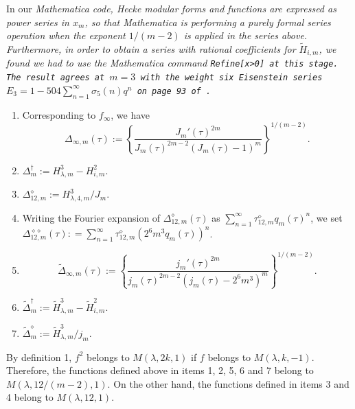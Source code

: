 \documentclass{article}
\begin{document}
In our 
\it Mathematica \rm code, 
Hecke modular forms and functions 
are expressed as 
power series in $x_m$,
so that \it Mathematica \rm is
performing a purely formal 
series operation
when the exponent $1/(m-2)$
is applied in the series above.
Furthermore, in order to obtain 
a series with rational coefficients
for  $\widetilde{H}_{i,m}$, 
we found we had to use the 
\it Mathematica \rm command 
\tt Refine[x>0] \rm at this stage.
The result agrees at $m  = 3$
with the
weight six Eisenstein series 
$E_3 = 1 - 504\sum_{n=1}^{\infty} \sigma_5(n) q^n$
on page 93 of \cite{serre1970course}.  
 \begin{definition}
 \begin{enumerate}
 \item
  Corresponding to $f_{\infty}$,
 we have
 $$
 \Delta_{\infty,m}(\tau) := 
 \left \{ \frac{J_m'(\tau)^{2m}}
 {J_m(\tau)^{2m-2}(J_m(\tau)-1)^m}
\right \}^{1/(m-2)}.
 $$
 \item 
 $\Delta^{\dagger}_m := 
H_{\lambda,m}^3 - H_{i,m}^2$.
\item 
$\Delta^{\diamond}_{12,m} :=
H_{\lambda,4,m}^3/J_m$.
\item
Writing the Fourier expansion of $\Delta^{\diamond}_{12,m}(\tau)$ as
$\sum_{n = 1}^{\infty}\tau^{\diamond}_{12,m} q_m(\tau)^n$,
we set \newline
$\Delta^{\diamond \diamond}_{12,m}(\tau): = 
\sum_{n = 1}^{\infty} \tau^{\diamond}_{12,m} (2^6 m^3 q_m(\tau))^n$.
  \item
 $$
 \widetilde{\Delta}_{\infty,m}(\tau) := 
 \left \{ \frac{j_m'(\tau)^{2m}}
 {j_m(\tau)^{2m-2}(j_m(\tau)-2^6 m^3)^m}
\right \}^{1/(m-2)}.
 $$
 \item
 $\widetilde{\Delta}^{\dagger}_m := 
\widetilde{H}_{\lambda,m}^3 - \widetilde{H}_{i,m}^2$.
\item
$\widetilde{\Delta}^{\diamond}_m := 
\widetilde{H}_{\lambda,m}^3/j_m$. 
 \end{enumerate}
 \end{definition} 
 \begin{remark}
 By definition 1, $f^2$ belongs to $M(\lambda, 2k, 1)$
 if $f$ belongs to $M(\lambda, k, -1)$. Therefore,
 the functions defined above in items 
 1, 2, 5, 6 and 7
 belong to $M(\lambda, 12/(m-2), 1)$.
 On the other hand, the functions defined in
 items 3 and 4 belong to $M(\lambda, 12, 1)$.
 \end{remark}
\end{document}
